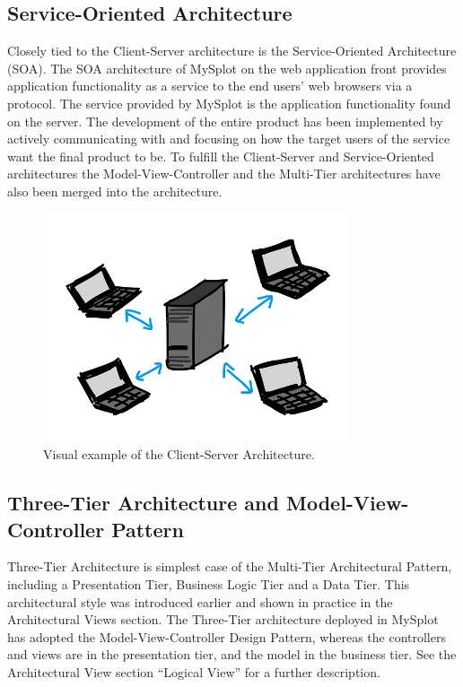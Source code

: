 \subsection{Service-Oriented Architecture}
Closely tied to the Client-Server architecture is the Service-Oriented Architecture (SOA). The SOA architecture of MySplot on the web application front provides application functionality as a service to the end users' web browsers via a protocol. The service provided by MySplot is the application functionality found on the server. The development of the entire product has been implemented by actively communicating with and focusing on how the target users of the service want the final product to be. To fulfill the Client-Server and Service-Oriented architectures the Model-View-Controller and the Multi-Tier architectures have also been merged into the architecture.

\begin{figure}
\centering
\includegraphics[width=90mm]{./Architecture/img/clientserver2.png}
\caption{Visual example of the Client-Server Architecture. \label{overflow}}
\end{figure}

\subsection{Three-Tier Architecture and Model-View-Controller Pattern} Three-Tier Architecture is simplest case of the Multi-Tier Architectural Pattern, including a Presentation Tier, Business Logic Tier and a Data Tier. This architectural style was introduced earlier and shown in practice in the Architectural Views section. The Three-Tier architecture deployed in MySplot has adopted the Model-View-Controller Design Pattern, whereas the controllers and views are in the presentation tier, and the model in the business tier. See the Architectural View section ``Logical View'' for a further description.

